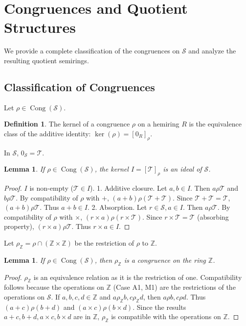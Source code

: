 \documentclass[11pt, a4paper]{article}
\theoremstyle{plain}
\newtheorem{lemma}[theorem]{Lemma}
\theoremstyle{definition}
\newtheorem{definition}[theorem]{Definition}
\numberwithin{equation}{section}
\newcommand{\Z}{\mathbb{Z}}
\newcommand{\Tobj}{\mathcal{T}} %
\newcommand{\SemiringS}{\mathcal{S}}
\DeclareMathOperator{\Cong}{Cong}
\begin{document}
\section{Congruences and Quotient Structures}

We provide a complete classification of the congruences on $\SemiringS$ and analyze the resulting quotient semirings.

\subsection{Classification of Congruences}

Let $\rho \in \Cong(\SemiringS)$.

\begin{definition}
The kernel of a congruence $\rho$ on a hemiring $R$ is the equivalence class of the additive identity: $\ker(\rho) = [0_R]_{\rho}$.
\end{definition}

In $\SemiringS$, $0_{\SemiringS}=\Tobj$.

\begin{lemma}\label{lem:kernel_is_ideal}
If $\rho \in \Cong(\SemiringS)$, the kernel $I=[\Tobj]_{\rho}$ is an ideal of $\SemiringS$.
\end{lemma}
\begin{proof}
$I$ is non-empty ($\Tobj \in I$).
1. Additive closure. Let $a, b \in I$. Then $a \rho \Tobj$ and $b \rho \Tobj$. By compatibility of $\rho$ with $+$, $(a+b) \rho (\Tobj+\Tobj)$. Since $\Tobj+\Tobj=\Tobj$, $(a+b) \rho \Tobj$. Thus $a+b \in I$.
2. Absorption. Let $r \in \SemiringS, a \in I$. Then $a \rho \Tobj$. By compatibility of $\rho$ with $\times$, $(r\times a) \rho (r\times\Tobj)$. Since $r\times\Tobj=\Tobj$ (absorbing property), $(r\times a) \rho \Tobj$. Thus $r\times a \in I$.
\end{proof}

Let $\rho_{\Z} = \rho \cap (\Z \times \Z)$ be the restriction of $\rho$ to $\Z$.

\begin{lemma}\label{lem:rho_Z_congruence}
If $\rho \in \Cong(\SemiringS)$, then $\rho_{\Z}$ is a congruence on the ring $\Z$.
\end{lemma}
\begin{proof}
$\rho_{\Z}$ is an equivalence relation as it is the restriction of one. Compatibility follows because the operations on $\Z$ (Case A1, M1) are the restrictions of the operations on $\SemiringS$. If $a, b, c, d \in \Z$ and $a \rho_{\Z} b, c \rho_{\Z} d$, then $a \rho b, c \rho d$. Thus $(a+c) \rho (b+d)$ and $(a\times c) \rho (b\times d)$. Since the results $a+c, b+d, a\times c, b\times d$ are in $\Z$, $\rho_{\Z}$ is compatible with the operations on $\Z$.
\end{proof}
\end{document}
